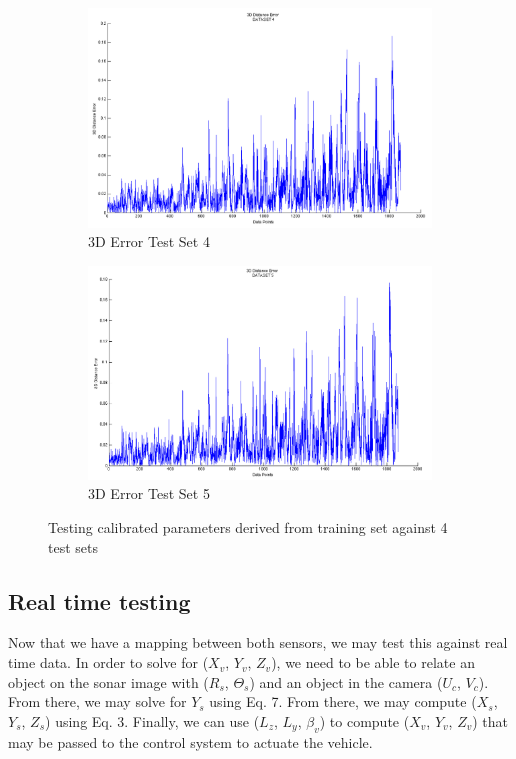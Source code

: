 \documentclass[a4paper]{IEEEtran}
\let\Theta\varTheta
\newcommand{\RSonar}{$\si{\textit{R}_{s}}$\xspace}
\newcommand{\ThetaSonar}{$\si{\Theta_{s}}$\xspace}
\newcommand{\UCamera}{$\si{\textit{U}_{c}}$\xspace}
\newcommand{\VCamera}{$\si{\textit{V}_{c}}$\xspace}
\newcommand{\XSonar}{$\si{\textit{X}_{s}}$\xspace}
\newcommand{\YSonar}{$\si{\textit{Y}_{s}}$\xspace}
\newcommand{\ZSonar}{$\si{\textit{Z}_{s}}$\xspace}
\newcommand{\XVehicle}{$\si{\textit{X}_{v}}$\xspace}
\newcommand{\YVehicle}{$\si{\textit{Y}_{v}}$\xspace}
\newcommand{\ZVehicle}{$\si{\textit{Z}_{v}}$\xspace}
\newcommand{\PitchVehicle}{${\beta_{v}}$\xspace}
\begin{document}
\begin{figure}%
\centering
\begin{subfigure}{\columnwidth}
\includegraphics[width=\columnwidth]{T4}%
\caption{3D Error Test Set 4}%
\label{subfiga}%
\end{subfigure}\hfill%
\begin{subfigure}{\columnwidth}
\includegraphics[width=\columnwidth]{T5}%
\caption{3D Error Test Set 5}%
\label{subfiga}%
\end{subfigure}\hfill%
\caption{Testing calibrated parameters derived from training set against 4 test sets}
\label{figabc}
\end{figure}

\subsection{Real time testing}

Now that we have a mapping between both sensors, we may test this against real time data. In order to solve for (\XVehicle, \YVehicle, \ZVehicle), we need to be able to relate an object on the sonar image with (\RSonar, \ThetaSonar) and an object in the camera (\UCamera, \VCamera). From there, we may solve for \YSonar using Eq. 7. From there, we may compute (\XSonar, \YSonar, \ZSonar) using Eq. 3. Finally, we can use ($L_{z}$, $L_{y}$, \PitchVehicle) to compute (\XVehicle, \YVehicle, \ZVehicle) that may be passed to the control system to actuate the vehicle.
\end{document}
